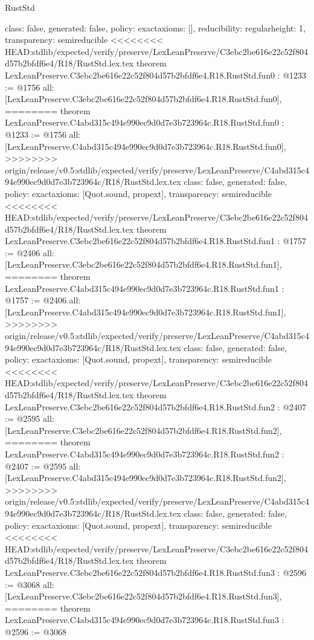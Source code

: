 \begin{lexlean}{RustStd}
\begin{coremodule}
{\begin{coremodule}
{{{  class: false,
  generated: false,
  policy: exact{axioms: []},
  reducibility: regular{height: 1},
  transparency: semireducible
}
<<<<<<<< HEAD:stdlib/expected/verify/preserve/LexLeanPreserve/C3ebc2be616e22c52f804d57b2bfdf6e4/R18/RustStd.lex.tex
theorem LexLeanPreserve.C3ebc2be616e22c52f804d57b2bfdf6e4.R18.RustStd.fun0 : @1233 := @1756 {
  all: [LexLeanPreserve.C3ebc2be616e22c52f804d57b2bfdf6e4.R18.RustStd.fun0],
========
theorem LexLeanPreserve.C4abd315c494e990ec9d0d7e3b723964c.R18.RustStd.fun0 : @1233 := @1756 {
  all: [LexLeanPreserve.C4abd315c494e990ec9d0d7e3b723964c.R18.RustStd.fun0],
>>>>>>>> origin/release/v0.5:stdlib/expected/verify/preserve/LexLeanPreserve/C4abd315c494e990ec9d0d7e3b723964c/R18/RustStd.lex.tex
  class: false,
  generated: false,
  policy: exact{axioms: [Quot.sound, propext]},
  transparency: semireducible
}
<<<<<<<< HEAD:stdlib/expected/verify/preserve/LexLeanPreserve/C3ebc2be616e22c52f804d57b2bfdf6e4/R18/RustStd.lex.tex
theorem LexLeanPreserve.C3ebc2be616e22c52f804d57b2bfdf6e4.R18.RustStd.fun1 : @1757 := @2406 {
  all: [LexLeanPreserve.C3ebc2be616e22c52f804d57b2bfdf6e4.R18.RustStd.fun1],
========
theorem LexLeanPreserve.C4abd315c494e990ec9d0d7e3b723964c.R18.RustStd.fun1 : @1757 := @2406 {
  all: [LexLeanPreserve.C4abd315c494e990ec9d0d7e3b723964c.R18.RustStd.fun1],
>>>>>>>> origin/release/v0.5:stdlib/expected/verify/preserve/LexLeanPreserve/C4abd315c494e990ec9d0d7e3b723964c/R18/RustStd.lex.tex
  class: false,
  generated: false,
  policy: exact{axioms: [Quot.sound, propext]},
  transparency: semireducible
}
<<<<<<<< HEAD:stdlib/expected/verify/preserve/LexLeanPreserve/C3ebc2be616e22c52f804d57b2bfdf6e4/R18/RustStd.lex.tex
theorem LexLeanPreserve.C3ebc2be616e22c52f804d57b2bfdf6e4.R18.RustStd.fun2 : @2407 := @2595 {
  all: [LexLeanPreserve.C3ebc2be616e22c52f804d57b2bfdf6e4.R18.RustStd.fun2],
========
theorem LexLeanPreserve.C4abd315c494e990ec9d0d7e3b723964c.R18.RustStd.fun2 : @2407 := @2595 {
  all: [LexLeanPreserve.C4abd315c494e990ec9d0d7e3b723964c.R18.RustStd.fun2],
>>>>>>>> origin/release/v0.5:stdlib/expected/verify/preserve/LexLeanPreserve/C4abd315c494e990ec9d0d7e3b723964c/R18/RustStd.lex.tex
  class: false,
  generated: false,
  policy: exact{axioms: [Quot.sound, propext]},
  transparency: semireducible
}
<<<<<<<< HEAD:stdlib/expected/verify/preserve/LexLeanPreserve/C3ebc2be616e22c52f804d57b2bfdf6e4/R18/RustStd.lex.tex
theorem LexLeanPreserve.C3ebc2be616e22c52f804d57b2bfdf6e4.R18.RustStd.fun3 : @2596 := @3068 {
  all: [LexLeanPreserve.C3ebc2be616e22c52f804d57b2bfdf6e4.R18.RustStd.fun3],
========
theorem LexLeanPreserve.C4abd315c494e990ec9d0d7e3b723964c.R18.RustStd.fun3 : @2596 := @3068 {
}}}}}}}
\end{coremodule}}
\end{coremodule}
\end{lexlean}
